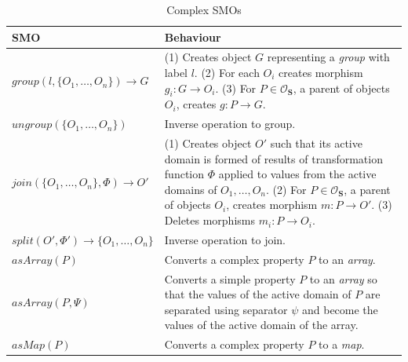 \begin{table}[htp!]
\centering
    \caption{Complex SMOs}
\scriptsize
\def\arraystretch{1.47}
\begin{tabular}{
    >{\raggedright\arraybackslash}p{35mm}%
    >{\raggedright\arraybackslash}p{84mm}%
    }
\toprule
\textbf{SMO}  & \textbf{Behaviour}  %
\\
\midrule

$group(l, \{O_1, \dots, O_n\}) \rightarrow G$ 
    & (1) Creates object $G$ representing a \textit{group} with label $l$. \newline (2) For each $O_i$ creates morphism $g_i : G \rightarrow O_i$. \newline (3) For $P \in \mathcal{O}_\mathbf{S}$, a parent of objects $O_i$, creates $g : P \rightarrow G$.
    \\
$ungroup(\{O_1, \dots, O_n\})$ 
    & Inverse operation to group. 
    \\
$join(\{O_1, \dots, O_n\}, \Phi) \rightarrow O'$ 
    &
    (1) Creates object $O'$ such that its active domain is formed of results of transformation function $\Phi$ applied to values from the active domains of $O_1, \dots, O_n$. \newline
    (2) For $P \in \mathcal{O}_\mathbf{S}$, a parent of objects $O_i$, creates morphism $m : P \rightarrow O'$. \newline 
    (3) Deletes morphisms $m_i: P \rightarrow O_i$. 
    \\
$split(O', \Phi') \rightarrow \{O_1, \dots, O_n\}$ 
    & Inverse operation to join.
    \\
$asArray(P)$ 
    & Converts a complex property $P$ to an \textit{array}. 
    \\
$asArray(P, \Psi)$ 
    & Converts a simple property $P$ to an \textit{array} so that the values of the active domain of $P$ are separated using separator $\psi$ and become the values of the active domain of the array.
    \\
$asMap(P)$ 
    & Converts a complex property $P$ to a \textit{map}.     
    \\
\bottomrule
\end{tabular}
\end{table}


